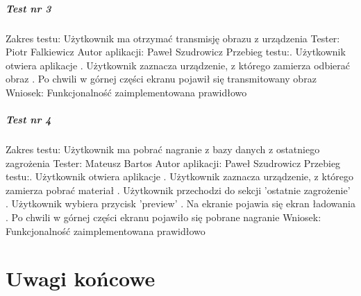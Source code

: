  \paragraph{Test nr 3}
Zakres testu:\newline
Użytkownik ma otrzymać transmisję obrazu z urządzenia\newline
Tester: Piotr Falkiewicz \newline
Autor aplikacji: Paweł Szudrowicz \newline
Przebieg testu:. Użytkownik otwiera aplikacje . Użytkownik zaznacza urządzenie, z którego zamierza odbierać obraz . Po chwili w górnej części ekranu pojawił się transmitowany obraz\newline
Wniosek:\newline
Funkcjonalność zaimplementowana prawidłowo\newline
\newline

 \paragraph{Test nr 4}
Zakres testu:\newline
Użytkownik ma pobrać nagranie z bazy danych z ostatniego zagrożenia\newline
Tester: Mateusz Bartos \newline
Autor aplikacji: Paweł Szudrowicz \newline
Przebieg testu:. Użytkownik otwiera aplikacje . Użytkownik zaznacza urządzenie, z którego zamierza pobrać materiał . Użytkownik przechodzi do sekcji 'ostatnie zagrożenie' . Użytkownik wybiera przycisk 'preview' . Na ekranie pojawia się ekran ładowania . Po chwili w górnej części ekranu pojawiło się pobrane nagranie \newline
Wniosek:\newline
Funkcjonalność zaimplementowana prawidłowo\newline


\chapter{Uwagi końcowe}

